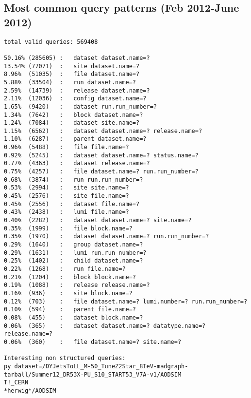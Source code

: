 \documentclass[a4paper,11pt,draft]{article}
\begin{document}
\subsection*{Most common query patterns (Feb 2012-June 2012)}
\begin{verbatim}
total valid queries: 569408

50.16% (285605) :	dataset dataset.name=?
13.54% (77071)  :	site dataset.name=?
8.96%  (51035) 	:	file dataset.name=?
5.88%  (33504) 	:	run dataset.name=?
2.59%  (14739) 	:	release dataset.name=?
2.11%  (12036) 	:	config dataset.name=?
1.65%  (9420) 	:	dataset run.run_number=?
1.34%  (7642) 	:	block dataset.name=?
1.24%  (7084) 	:	dataset site.name=?
1.15%  (6562) 	:	dataset dataset.name=? release.name=?
1.10%  (6287) 	:	parent dataset.name=?
0.96%  (5488) 	:	file file.name=?
0.92%  (5245) 	:	dataset dataset.name=? status.name=?
0.77%  (4363) 	:	dataset release.name=?
0.75%  (4257) 	:	file dataset.name=? run.run_number=?
0.68%  (3874) 	:	run run.run_number=?
0.53%  (2994) 	:	site site.name=?
0.45%  (2576) 	:	site file.name=?
0.45%  (2556) 	:	dataset file.name=?
0.43%  (2438) 	:	lumi file.name=?
0.40%  (2282) 	:	dataset dataset.name=? site.name=?
0.35%  (1999) 	:	file block.name=?
0.35%  (1970) 	:	dataset dataset.name=? run.run_number=?
0.29%  (1640) 	:	group dataset.name=?
0.29%  (1631) 	:	lumi run.run_number=?
0.25%  (1402) 	:	child dataset.name=?
0.22%  (1268) 	:	run file.name=?
0.21%  (1204) 	:	block block.name=?
0.19%  (1088) 	:	release release.name=?
0.16%  (936) 	:	site block.name=?
0.12%  (703) 	:	file dataset.name=? lumi.number=? run.run_number=?
0.10%  (594) 	:	parent file.name=?
0.08%  (455) 	:	dataset block.name=?
0.06%  (365) 	:	dataset dataset.name=? datatype.name=? release.name=?
0.06%  (360) 	:	file dataset.name=? site.name=?

Interesting non structured queries:
py dataset=/DYJetsToLL_M-50_TuneZ2Star_8TeV-madgraph-tarball/Summer12_DR53X-PU_S10_START53_V7A-v1/AODSIM
T!_CERN
*herwig*/AODSIM

\end{verbatim}
\end{document}

